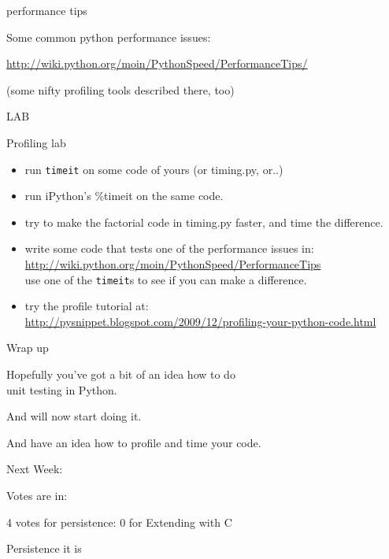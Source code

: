 \documentclass{beamer}
\begin{document}
\begin{frame}[fragile]{performance tips}

\vfill
{\Large Some common python performance issues:}

\vfill
\url{http://wiki.python.org/moin/PythonSpeed/PerformanceTips/}

\vfill
(some nifty profiling tools described there, too)

\end{frame} 

\begin{frame}[fragile]{LAB}

{\Large Profiling lab}
\begin{itemize}
  \item run \verb|timeit| on some code of yours (or timing.py, or..)
  \item run iPython's \%timeit on the same code.
  \item try to make the factorial code in timing.py faster, and time the difference.
  \item write some code that tests one of the performance issues in:\\
        {\small \url{http://wiki.python.org/moin/PythonSpeed/PerformanceTips} }\\
        use one of the \verb|timeit|s to see if you can make a difference.
  \item try the profile tutorial at:\\
        {\small \url{http://pysnippet.blogspot.com/2009/12/profiling-your-python-code.html} }
\end{itemize}

\end{frame}



\begin{frame}[fragile]{Wrap up}

\vfill
{\Large Hopefully you've got a bit of an idea how to do\\[0.1in]
        unit testing in Python.}

\vfill
{\Large And will now start doing it.}

\vfill
{\Large And have an idea how to profile and time your code.}

\end{frame}

\begin{frame}[fragile]{Next Week:}

\vfill
{\Large Votes are in:}

\vfill
{\Large 4 votes for persistence: 0 for Extending with C}

\vfill
{\LARGE Persistence it is}

\vfill

\end{frame}
\end{document}
